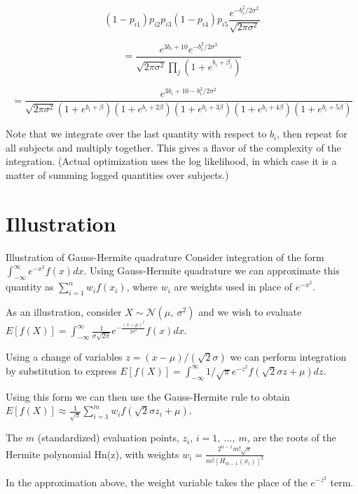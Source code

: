 \documentclass[
  9pt,
  ignorenonframetext,
]{beamer}
\begin{document}
\begin{frame}{}
\protect\hypertarget{section-10}{}
\[
(1-p_{i1})p_{i2} p_{i3} (1-p_{i4})p_{i5} \frac {e^{-b_i^2/2\sigma ^2}} {\sqrt{2\pi \sigma ^2 }} 
\]

\vspace{-5mm}

\[
 =\frac {e^{3b_i+10} e^{-b_i^2/2\sigma^2}} {\sqrt {2\pi \sigma ^2} \prod_j (1+e^{b_i+\beta_j})} 
 \]

\vspace{-5mm}

\[ =\frac {e^{3b_i+10-b_i^2/2\sigma ^2}}  {\sqrt {2\pi \sigma ^2 } (1+e^{b_i+\beta})(1+e^{b_i+2\beta})(1+e^{b_i+3\beta})(1+e^{b_i+4\beta})(1+e^{b_i+5\beta})}
\]

Note that we integrate over the last quantity with respect to \(b_i\),
then repeat for all subjects and multiply together. This gives a flavor
of the complexity of the integration. (Actual optimization uses the log
likelihood, in which case it is a matter of summing logged quantities
over subjects.)
\end{frame}

\hypertarget{illustration}{%
\section{Illustration}\label{illustration}}

\begin{frame}{Illustration of Gauss-Hermite quadrature}
\protect\hypertarget{illustration-of-gauss-hermite-quadrature}{}
Consider integration of the form
\(\int_{-\infty }^\infty e^{-x^2} f(x)dx\). Using Gauss-Hermite
quadrature we can approximate this quantity as
\(\sum _{i=1}^nw_i f(x_i)\), where \(w_i\) are weights used in place of
\(e^{-x^2}\).

As an illustration, consider \(X \sim \mathcal N (\mu,\ \sigma ^2)\) and
we wish to evaluate
\(E[f(X)] = \int_{-\infty }^\infty \frac 1 {\sigma \sqrt {2\pi}} e^{-\frac {(x-\mu)^2} {2\sigma ^2}} f(x) dx\).

Using a change of variables \(z=(x-\mu)/(\sqrt {2} \sigma )\) we can
perform integration by substitution to express
\(E[f(X)]=\int_{-\infty }^\infty 1/\sqrt {\pi} e^{-z^2} f(\sqrt {2} \sigma z+\mu) dz\).

Using this form we can then use the Gauss-Hermite rule to obtain
\(E[f(X)] \approx \frac 1 {\sqrt {\pi}} \sum _{i=1}^m w_i f(\sqrt {2} \sigma z_i+\mu)\).

The \(m\) (standardized) evaluation points, \(z_i\), \(i=1,\ ...,\ m\),
are the roots of the Hermite polynomial Hn(z), with weights
\(w_i=\frac {2^{n-1} m!\sqrt {\pi}} {m^2 [H_{m-1} (x_i)]^2}\)

In the approximation above, the weight variable takes the place of the
\(e^{-z^2}\) term.
\end{frame}
\end{document}
